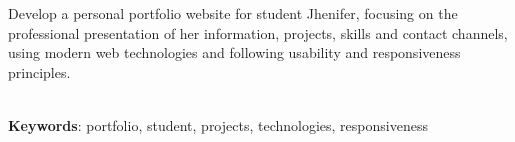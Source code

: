 \begin{thesisabastract}
Develop a personal portfolio website for student Jhenifer, focusing on the professional presentation of her information, projects, skills and contact channels, using modern web technologies and following usability and responsiveness principles.

\ \\


\textbf{Keywords}: portfolio, student, projects, technologies, responsiveness

\end{thesisabastract}
